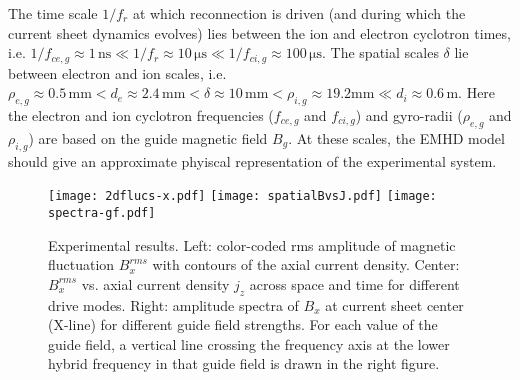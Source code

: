 \documentclass[aip,preprint]{revtex4-1}
\begin{document}
The time scale $1/f_r$ at which reconnection is driven (and during which the current sheet dynamics evolves) lies between the ion and electron cyclotron times, i.e. $1/f_{ce,g}\approx 1\,\mathrm{ns}\ll 1/f_r\approx 10\,\mathrm{\mu s}\ll 1/f_{ci,g}\approx100\,\mathrm{\mu s}$. 
The spatial scales $\delta$ lie between electron and ion scales, i.e. $\rho_{e,g} \approx 0.5\,\mathrm{mm} < d_e \approx 2.4\,\mathrm{mm} < \delta \approx 10\, \mathrm{mm}< \rho_{i,g}\approx 19.2 \mathrm{mm}\ll d_i \approx 0.6\,\mathrm{m}$. Here the electron and ion cyclotron frequencies ($f_{ce,g}$ and $f_{ci,g}$) and gyro-radii ($\rho_{e,g}$ and $\rho_{i,g}$) are based on the guide magnetic field $B_g$. At these scales, the EMHD model  
 should give an approximate phyiscal representation of the experimental system.

\begin{figure}[h]
\texttt{[image: 2dflucs-x.pdf]}
\texttt{[image: spatialBvsJ.pdf]}
\texttt{[image: spectra-gf.pdf]}
\caption{Experimental results.
Left: color-coded rms amplitude of magnetic fluctuation $B_x^{rms}$ with contours of the axial current density.
Center: $B_x^{rms}$ vs. axial current density $j_z$ across space and time for different drive modes.
Right: amplitude spectra of $B_x$ at current sheet center (X-line) for different guide field strengths. For each value of the guide field, a vertical line crossing the frequency axis at the lower hybrid frequency in that guide field is drawn in the right figure. 
}
\label{fig:exp-flucs}
\end{figure}
\end{document}
